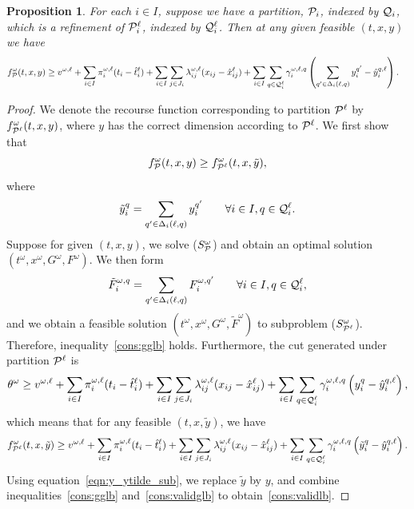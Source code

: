 \documentclass[11pt]{article}
\newtheorem{proposition}[theorem]{Proposition}
\newcommand{\cQ}{{\cal Q}}
\newcommand{\cP}{{\cal P}}
\begin{document}
	\begin{proposition} \label{prop:validity}
		For each $i \in I$, suppose we have a partition, \(\cP_i\), indexed by \(\cQ_i\), which is a refinement of \(\cP_i^\ell\), indexed by \(\cQ_i^\ell\). Then at any given feasible \((t,x,y)\) we have
		{
			\begin{align} \label{cons:validlb}
			&f^\omega_{\cP}(t,x,y) \geq v^{\omega,\ell} + \sum_{i \in I} \pi_i^{\omega,\ell} (t_i - \hat{t}_i^{\ell}) + \sum_{i \in I} \sum_{j \in J_i} \lambda_{ij}^{\omega,\ell} (x_{ij} - \hat{x}_{ij}^{\ell}) + %
			\sum_{i \in I} \sum_{q \in \cQ^{\ell}_i} \gamma_{i}^{\omega,\ell,q} \left( \sum_{q^\prime \in \Delta_i(\ell,q)} y_i^{q^\prime} - \hat{y}_i^{q,\ell} \right). %
			\end{align}
		}
	\end{proposition}
	\begin{proof}
		We denote the recourse function corresponding to partition \(\cP^{\ell}\) by \(f^\omega_{\cP^\ell}(t,x,y)\), where \(y\) has the correct dimension according to \(\cP^\ell\). We first show that 
		\begin{equation} \label{cons:gglb}
		f^\omega_{\cP}(t,x,y) \geq f^{\omega}_{\cP^\ell}(t,x,\tilde{y}),
		\end{equation}
		where 
		\begin{equation}\label{eqn:y_ytilde_sub}
		\tilde{y}_i^{q} =  \sum_{q^\prime \in \Delta_i(\ell,q)} y_i^{q^\prime} \qquad  \forall i \in I, q \in \cQ^\ell_i.
		\end{equation}
		Suppose for given \((t,x,y)\), we solve (\(S_{\cP}^\omega\)) and obtain an optimal solution \((t^{\omega},x^{\omega},G^{\omega},F^{\omega})\). We then form \[\tilde{F}^{\omega,q}_i = \sum_{q^\prime \in \Delta_i(\ell,q) }F_i^{\omega,q^\prime} \qquad  \forall i \in I, q \in \cQ^\ell_i, \]
		and we obtain a feasible solution \((t^{\omega},x^{\omega},G^{\omega},\tilde{F}^{\omega})\) to subproblem (\(S_{\cP^\ell}^\omega\)). Therefore, inequality~\eqref{cons:gglb} holds. Furthermore, the cut generated under partition \(\cP^\ell\) is
		\[\theta^\omega \geq v^{\omega,\ell} + \sum_{i \in I} \pi_i^{\omega,\ell} (t_i - \hat{t}_i^{\ell}) + \sum_{i \in I} \sum_{j \in J_i} \lambda_{ij}^{\omega,\ell} (x_{ij} - \hat{x}_{ij}^{\ell}) + \sum_{i \in I} \sum_{q \in \cQ^{\ell}_i} \gamma_{i}^{\omega,\ell,q} \left( y_i^{q} - \hat{y}_i^{q,\ell} \right),\]
		which means that for any feasible \((t,x,\tilde{y})\), we have 
		\begin{equation} \label{cons:validglb}
		f^\omega_{\cP^\ell}(t,x,\tilde{y}) \geq v^{\omega,\ell} + \sum_{i \in I} \pi_i^{\omega,\ell} (t_i - \hat{t}_i^{\ell}) + \sum_{i \in I} \sum_{j \in J_i} \lambda_{ij}^{\omega,\ell} (x_{ij} - \hat{x}_{ij}^{\ell}) + \sum_{i \in I} \sum_{q \in \cQ^{\ell}_i} \gamma_{i}^{\omega,\ell,q} \left( \tilde{y}_i^{q} - \hat{y}_i^{q,\ell} \right).
		\end{equation}
		Using equation~\eqref{eqn:y_ytilde_sub}, we replace \(\tilde{y}\) by \(y\), and combine inequalities~\eqref{cons:gglb} and~\eqref{cons:validglb} to obtain~\eqref{cons:validlb}.
	\end{proof}
\end{document}
